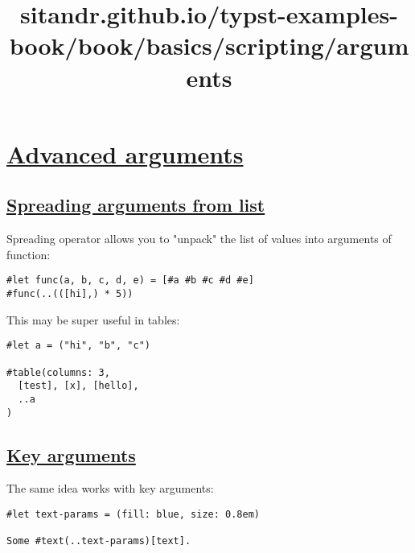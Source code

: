 \title{sitandr.github.io/typst-examples-book/book/basics/scripting/arguments}

\section{\texorpdfstring{\hyperref[advanced-arguments]{Advanced
arguments}}{Advanced arguments}}\label{advanced-arguments}

\subsection{\texorpdfstring{\hyperref[spreading-arguments-from-list]{Spreading
arguments from
list}}{Spreading arguments from list}}\label{spreading-arguments-from-list}

Spreading operator allows you to "unpack" the list of values into
arguments of function:

\begin{verbatim}
#let func(a, b, c, d, e) = [#a #b #c #d #e]
#func(..(([hi],) * 5))
\end{verbatim}

\pandocbounded{}

This may be super useful in tables:

\begin{verbatim}
#let a = ("hi", "b", "c")

#table(columns: 3,
  [test], [x], [hello],
  ..a
)
\end{verbatim}

\pandocbounded{}

\subsection{\texorpdfstring{\hyperref[key-arguments]{Key
arguments}}{Key arguments}}\label{key-arguments}

The same idea works with key arguments:

\begin{verbatim}
#let text-params = (fill: blue, size: 0.8em)

Some #text(..text-params)[text].
\end{verbatim}

\pandocbounded{}

